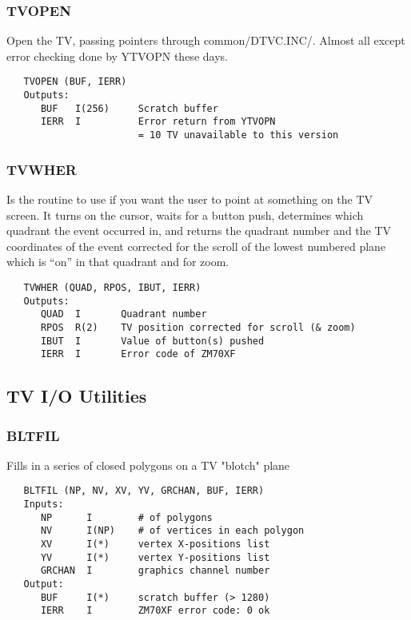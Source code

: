 \subsubsection{TVOPEN}
Open the TV, passing pointers through common/DTVC.INC/.  Almost all
except error checking done by YTVOPN these days.
\begin{verbatim}
   TVOPEN (BUF, IERR)
   Outputs:
      BUF   I(256)     Scratch buffer
      IERR  I          Error return from YTVOPN
                       = 10 TV unavailable to this version
\end{verbatim}

\subsubsection{TVWHER}
Is the routine to use if you want the user to point at
something on the TV screen.  It turns on the cursor, waits for a
button push, determines which quadrant the event occurred in, and
returns the quadrant number and the TV coordinates of the event
corrected for the scroll of the lowest numbered plane which is
``on'' in that quadrant  and for zoom.
\begin{verbatim}
   TVWHER (QUAD, RPOS, IBUT, IERR)
   Outputs:
      QUAD  I       Quadrant number
      RPOS  R(2)    TV position corrected for scroll (& zoom)
      IBUT  I       Value of button(s) pushed
      IERR  I       Error code of ZM70XF
\end{verbatim}

\subsection{TV I/O Utilities}

\subsubsection{BLTFIL}
Fills in a series of closed polygons on a TV "blotch" plane
\begin{verbatim}
   BLTFIL (NP, NV, XV, YV, GRCHAN, BUF, IERR)
   Inputs:
      NP      I        # of polygons
      NV      I(NP)    # of vertices in each polygon
      XV      I(*)     vertex X-positions list
      YV      I(*)     vertex Y-positions list
      GRCHAN  I        graphics channel number
   Output:
      BUF     I(*)     scratch buffer (> 1280)
      IERR    I        ZM70XF error code: 0 ok
\end{verbatim}


